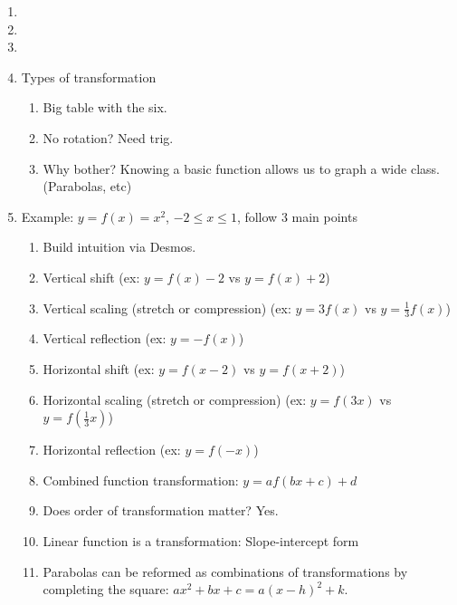 \documentclass{article}
\begin{document}
\begin{enumerate}
\item

\item

\item

\item Types of transformation
\begin{enumerate}
\item Big table with the six.
\item No rotation? Need trig.
\item Why bother? Knowing a basic function allows us to graph a wide class. (Parabolas, etc)
\end{enumerate}

\item Example: $y=f(x)=x^2$, $-2\leq x \leq 1$, follow 3 main points
\begin{enumerate}
\item Build intuition via Desmos. 
\item Vertical shift (ex: $y=f(x)-2$ vs $y=f(x)+2$)
\item Vertical scaling (stretch or compression) (ex: $y=3f(x)$ vs $y=\frac{1}{3}f(x)$)
\item Vertical reflection (ex: $y=-f(x)$)
\item Horizontal shift (ex: $y=f(x-2)$ vs $y=f(x+2)$)
\item Horizontal scaling (stretch or compression) (ex: $y=f(3x)$ vs $y=f(\frac{1}{3}x)$)
\item Horizontal reflection (ex: $y=f(-x)$)
\item Combined function transformation: $y=af(bx+c)+d$
\item Does order of transformation matter? Yes.
\item Linear function is a transformation: Slope-intercept form
\item Parabolas can be reformed as combinations of transformations by completing the square: $ax^2+bx+c=a(x-h)^2+k$.
\end{enumerate}


\end{enumerate}
\end{document}
